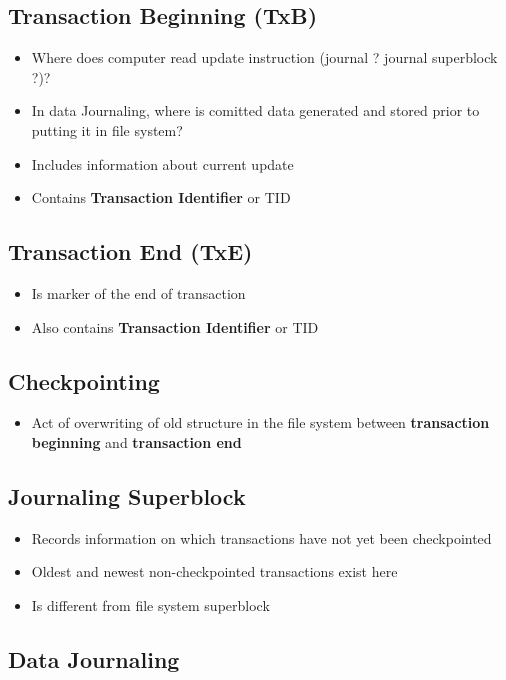 \documentclass[12pt]{article}
\begin{document}
\subsection{Transaction Beginning (TxB)}
\begin{itemize}
    \item Where does computer read update instruction (journal ? journal superblock ?)?
    \item In data Journaling, where is comitted data generated and stored prior to putting it in file system?
    \item Includes information about current update
    \item Contains \textbf{Transaction Identifier} or TID
\end{itemize}

\subsection{Transaction End (TxE)}
\begin{itemize}
    \item Is marker of the end of transaction
    \item Also contains \textbf{Transaction Identifier} or TID
\end{itemize}

\subsection{Checkpointing}
\begin{itemize}
    \item Act of overwriting of old structure in the file system between
    \textbf{transaction beginning} and \textbf{transaction end}
\end{itemize}

\subsection{Journaling Superblock}

\begin{itemize}
    \item Records information on which transactions have not yet been checkpointed
    \item Oldest and newest non-checkpointed transactions exist here
    \item Is different from file system superblock
\end{itemize}

\subsection{Data Journaling}
\end{document}
